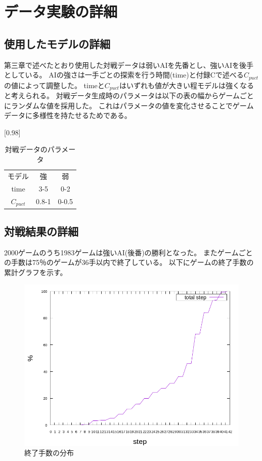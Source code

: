 \chapter{データ実験の詳細}
\section{使用したモデルの詳細}
第三章で述べたとおり使用した対戦データは弱いAIを先番とし、強いAIを後手としている。
AIの強さは一手ごとの探索を行う時間(time)と付録Cで述べる$C_{puct}$の値によって調整した。
timeと$C_{puct}$はいずれも値が大きい程モデルは強くなると考えられる。
対戦データ生成時のパラメータは以下の表の幅からゲームごとにランダムな値を採用した。
これはパラメータの値を変化させることでゲームデータに多様性を持たせるためである。
\begin{table}[H]
	\caption{対戦データのパラメータ}
	\centering
	\scalebox{0.98}[0.98]{
		\begin{tabular}{c|c|c}
			モデル&強&弱\\
			time    & 3-5 & 0-2 \\ \hline
			$C_{puct}$ & 0.8-1   & 0-0.5 \\

		\end{tabular}
	}
	\label{table:battle}
\end{table}

\section{対戦結果の詳細}
2000ゲームのうち1983ゲームは強いAI(後番)の勝利となった。
またゲームごとの手数は75％のゲームが36手以内で終了している。
以下にゲームの終了手数の累計グラフを示す。
\begin{figure}[t]
	\centering
	\includegraphics[width=\linewidth]{./figure/stepCum.png}
	\caption{終了手数の分布}
	\label{fig:network}
\end{figure}
